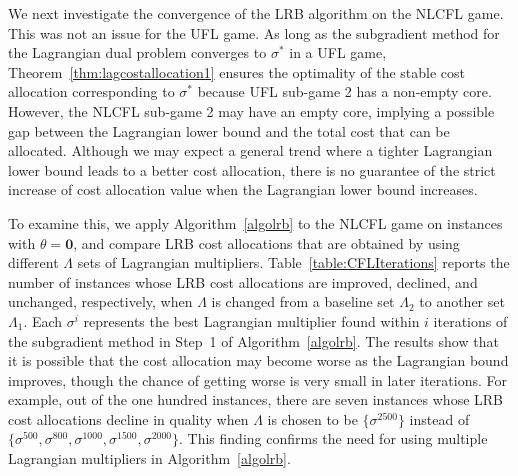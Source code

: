 \documentclass[ijoc,nonblindrev]{informs3} %
\begin{document}
We next investigate the convergence of the LRB algorithm on the NLCFL game.
This was not an issue for the UFL game.
As long as the subgradient method for the Lagrangian dual problem converges to $\sigma^*$ in a UFL game, Theorem~\ref{thm:lagcostallocation1} ensures the optimality of the stable cost allocation corresponding to $\sigma^*$ because UFL sub-game 2 has a non-empty core.
However, the NLCFL sub-game 2 may have an empty core, implying a possible gap between the Lagrangian lower bound and the total cost that can be allocated.
Although we may expect a general trend where a tighter Lagrangian lower bound leads to a better cost allocation, there is no guarantee of the strict increase of cost allocation value when the Lagrangian lower bound increases.


To examine this, we apply Algorithm~\ref{algolrb} to the NLCFL game on instances with $\theta=\textbf{0}$, and compare LRB cost allocations that are obtained by using different $\Lambda$ sets of Lagrangian multipliers. Table~\ref{table:CFLIterations} reports the number of instances whose LRB cost allocations are improved, declined, and unchanged, respectively, when $\Lambda$ is changed from a baseline set $\Lambda_2$ to another set $\Lambda_1$.
Each $\sigma^{i}$ represents the best Lagrangian multiplier found within $i$ iterations of the subgradient method in Step~1 of Algorithm~\ref{algolrb}. The results show that it is possible that the cost allocation may become worse as the Lagrangian bound improves, though the chance of getting worse is very small in later iterations. For example, out of the one hundred instances, there are seven instances whose LRB cost allocations decline in quality when $\Lambda$ is chosen to be $\{\sigma^{2500}\}$ instead of $\{\sigma^{500},\sigma^{800},\sigma^{1000},\sigma^{1500},\sigma^{2000}\}$. This finding confirms the need for using multiple Lagrangian multipliers in Algorithm~\ref{algolrb}.
\end{document}

